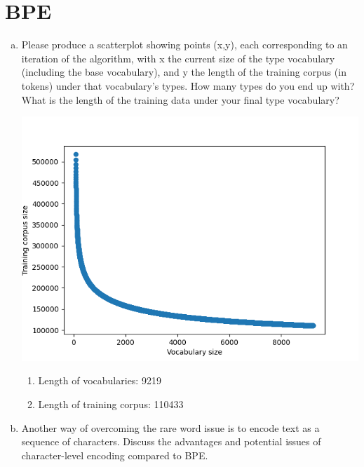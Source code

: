 \documentclass{article}
\newenvironment{solution}{\color{blue}}{}
\begin{document}
\newpage
\section{BPE}
\begin{enumerate}[(a)]
  \item Please produce a scatterplot showing points (x,y), each corresponding to an 
  iteration of the algorithm, with x the current size of the type vocabulary 
  (including the base vocabulary), and y the length of the training corpus (in tokens)
  under that vocabulary's types. How many types do you end up with? What is the 
  length of the training data under your final type vocabulary?

  \begin{solution}
    \begin{center}
      \includegraphics[scale=0.6]{Figure_1.png}
    \end{center}

    \begin{enumerate}[1.]
      \item Length of vocabularies: 9219
      \item Length of training corpus: 110433
    \end{enumerate}
  \end{solution}

  \item Another way of overcoming the rare word issue is to encode text as a 
  sequence of characters. Discuss the advantages and potential issues of character-level
  encoding compared to BPE.


\end{enumerate}
\end{document}
